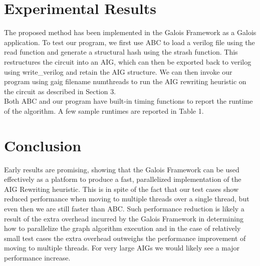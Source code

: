 \documentclass[twocolumn]{article}
\begin{document}
\section{Experimental Results}
The proposed method has been implemented in the Galois Framework\cite{GALOIS} as a Galois application. To test our program, we first use ABC to load a verilog file using the read function and generate a structural hash using the strash function. This restructures the circuit into an AIG, which can then be exported back to verilog using write\_verilog and retain the AIG structure.  We can then invoke our program using gaig filename numthreads to run the AIG rewriting heuristic on the circuit as described in Section 3. \\\indent
Both ABC and our program have built-in timing functions to report the runtime of the algorithm. A few sample runtimes are reported in Table 1.

\section{Conclusion}
Early results are promising, showing that the Galois Framework can be used effectively as a platform to produce a fast, parallelized implementation of the AIG Rewriting heuristic. This is in spite of the fact that our test cases show reduced performance when moving to multiple threads over a single thread, but even then we are still faster than ABC. Such performance reduction is likely a result of the extra overhead incurred by the Galois Framework in determining how to parallelize the graph algorithm execution and in the case of relatively small test cases the extra overhead outweighs the performance improvement of moving to multiple threads. For very large AIGs we would likely see a major performance increase.
\end{document}
